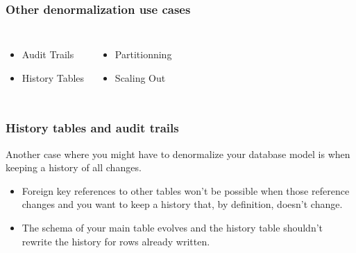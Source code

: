 \documentclass[xcolor=dvipsnames]{beamer}
\begin{document}
{
  
  \begin{frame}[fragile]
    \frametitle{Other denormalization use cases}

    \begin{columns}[c]
      \begin{itemize}
      \item {\Large Audit Trails}
      \item {\Large History Tables}
      \end{itemize}

      \begin{itemize}
      \item {\Large Partitionning}
      \item {\Large Scaling Out}
      \end{itemize}
    \end{columns}
  \end{frame}
}


\begin{frame}[fragile]
  \frametitle{History tables and audit trails}

  Another case where you might have to denormalize your database model is
  when keeping a history of all changes.
  \vfill

  \begin{itemize}
  \item
    Foreign key references to other tables won't be possible when those
    reference changes and you want to keep a history that, by definition,
    doesn't change.
    \newline
    
  \item
    The schema of your main table evolves and the history table shouldn't
    rewrite the history for rows already written.
  \end{itemize}
\end{frame}
\end{document}

